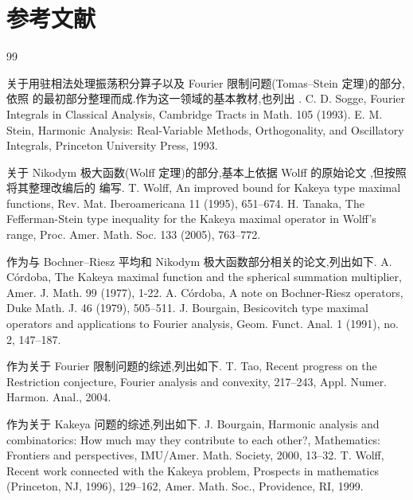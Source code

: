 \section*{参考文献}
\begin{thebibliography}{99}
\newCJKfontfamily{}
\begin{sloppypar}
\item[] 关于用驻相法处理振荡积分算子以及 Fourier 限制问题(Tomas--Stein 定理)的部分,依照 \cite{ch4:1} 的最初部分整理而成.作为这一领域的基本教材,也列出 \cite{ch4:2}.
 C. D. Sogge, Fourier Integrals in Classical Analysis, Cambridge Tracts in Math. 105 (1993).
 E. M. Stein, Harmonic Analysis: Real-Variable Methods, Orthogonality, and Oscillatory Integrals, Princeton University Press, 1993.
\item[] 关于 Nikodym 极大函数(Wolff 定理)的部分,基本上依据 Wolff 的原始论文 \cite{ch4:3},但按照将其整理改编后的 \cite{ch4:4} 编写.
 T. Wolff, An improved bound for Kakeya type maximal functions, Rev. Mat. Iberoamericana 11 (1995), 651--674.
 H. Tanaka, The Fefferman-Stein type inequality for the Kakeya maximal operator in Wolff's range, Proc. Amer. Math. Soc. 133 (2005), 763--772.
\item[] 作为与 Bochner--Riesz 平均和 Nikodym 极大函数部分相关的论文,列出如下.
 A. C\'ordoba, The Kakeya maximal function and the spherical summation multiplier, Amer. J. Math. 99 (1977), 1-22.
 A. C\'ordoba, A note on Bochner-Riesz operators, Duke Math. J. 46 (1979), 505--511.
 J. Bourgain, Besicovitch type maximal operators and applications to Fourier analysis, Geom. Funct. Anal. 1 (1991), no. 2, 147--187.
\item[] 作为关于 Fourier 限制问题的综述,列出如下.
 T. Tao, Recent progress on the Restriction conjecture, Fourier analysis and convexity, 217--243, Appl. Numer. Harmon. Anal., 2004.
\item[] 作为关于 Kakeya 问题的综述,列出如下.
 J. Bourgain, Harmonic analysis and combinatorics: How much may they contribute to each other?, Mathematics: Frontiers and perspectives, IMU/Amer. Math. Society, 2000, 13--32.
 T. Wolff, Recent work connected with the Kakeya problem, Prospects in mathematics (Princeton, NJ, 1996), 129--162, Amer. Math. Soc., Providence, RI, 1999.

\end{sloppypar}
\end{thebibliography}
